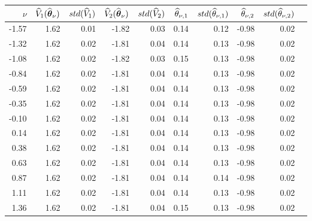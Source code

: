 \begin{tabular}{rrrrrrrrrr}\hline 
$\nu$  & $\widehat{V}_1(\widehat{\boldsymbol{\theta}}_{\nu})$ & $std(\widehat{V}_1)$ & $\widehat{V}_2(\widehat{\boldsymbol{\theta}}_{\nu})$ & $std(\widehat{V}_2)$ & $\widehat{\theta}_{\nu,1}$ & $std(\widehat{\theta}_{\nu,1})$ & $\widehat{\theta}_{\nu,2}$ & $std(\widehat{\theta}_{\nu,2})$ \\ \hline 
-1.57 &     1.62 &     0.01  &    -1.82 &      0.03 &      0.14 &      0.12 &     -0.98 &      0.02 \\ 
-1.32 &     1.62 &     0.02  &    -1.81 &      0.04 &      0.14 &      0.13 &     -0.98 &      0.02 \\ 
-1.08 &     1.62 &     0.02  &    -1.82 &      0.03 &      0.15 &      0.13 &     -0.98 &      0.02 \\ 
-0.84 &     1.62 &     0.02  &    -1.81 &      0.04 &      0.14 &      0.13 &     -0.98 &      0.02 \\ 
-0.59 &     1.62 &     0.02  &    -1.81 &      0.04 &      0.14 &      0.13 &     -0.98 &      0.02 \\ 
-0.35 &     1.62 &     0.02  &    -1.81 &      0.04 &      0.14 &      0.13 &     -0.98 &      0.02 \\ 
-0.10 &     1.62 &     0.02  &    -1.81 &      0.04 &      0.14 &      0.13 &     -0.98 &      0.02 \\ 
 0.14 &     1.62 &     0.02  &    -1.81 &      0.04 &      0.14 &      0.13 &     -0.98 &      0.02 \\ 
 0.38 &     1.62 &     0.02  &    -1.81 &      0.04 &      0.14 &      0.13 &     -0.98 &      0.02 \\ 
 0.63 &     1.62 &     0.02  &    -1.81 &      0.04 &      0.14 &      0.13 &     -0.98 &      0.02 \\ 
 0.87 &     1.62 &     0.02  &    -1.81 &      0.04 &      0.14 &      0.14 &     -0.98 &      0.02 \\ 
 1.11 &     1.62 &     0.02  &    -1.81 &      0.04 &      0.14 &      0.13 &     -0.98 &      0.02 \\ 
 1.36 &     1.62 &     0.02  &    -1.81 &      0.04 &      0.15 &      0.13 &     -0.98 &      0.02 \\ 

\end{tabular}

